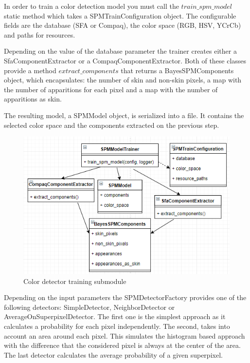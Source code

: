\documentclass[12pt]{report}
\begin{document}
	In order to train a color detection model you must call the $train\_spm\_model$ static method which takes a SPMTrainConfiguration object. The configurable fields are the database (SFA or Compaq), the color space (RGB, HSV, YCrCb) and paths for resources. 
	
	Depending on the value of the database parameter the trainer creates either a SfaComponentExtractor or a CompaqComponentExtractor. Both of these classes provide a method $extract\_components$ that returns a BayesSPMComponents object, which encapsulates: the number of skin and non-skin pixels, a map with the number of apparitions for each pixel and a map with the number of apparitions as skin.
	
	The resulting model, a SPMModel object, is serialized into a file. It contains the selected color space and the components extracted on the previous step.
	
	\begin{figure}[h!]
		\centering
		\includegraphics[]{design/color_train.png}
		\caption{Color detector training submodule}
		\label{fig:color_train}
	\end{figure}
	
	Depending on the input parameters the SPMDetectorFactory provides one of the following detectors: SimpleDetector, NeighborDetector or AverageOnSuperpixelDetector. The first one is the simplest approach as it calculates a probability for each pixel independently. The second, takes into account an area around each pixel. This simulates the histogram based approach with the difference that the considered pixel is always at the center of the area. The last detector calculates the average probability of a given superpixel.
	
\end{document}
